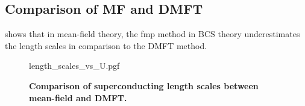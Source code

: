 \documentclass[../notes.tex]{subfiles}
\begin{document}
\subsection*{Comparison of MF and DMFT}

 shows that in mean-field theory, the \gls{fmp} method in BCS theory underestimates the length scales in comparison to the DMFT method.  

\begin{figure}[tb]
	\centering
	{length_scales_vs_U.pgf}
	\caption[Comparison of superconducting length scales between mean-field and DMFT.]{\textbf{Comparison of superconducting length scales between mean-field and DMFT.}}
	\label{fig:length scales MF and DMFT}
\end{figure}
\end{document}

